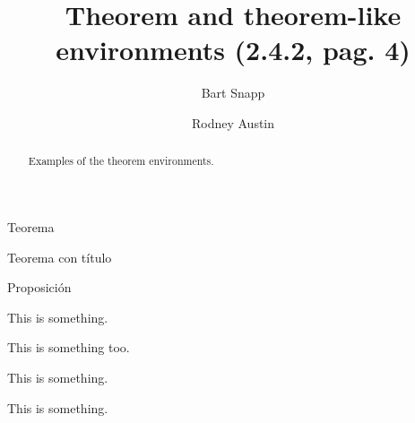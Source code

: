 \documentclass{ximera}
\author{Bart Snapp \and Rodney Austin}
\title[Examples:]{Theorem and theorem-like environments (2.4.2, pag. 4)}
\begin{document}
\begin{abstract}
  Examples of the theorem environments.
\end{abstract}
\maketitle


\lipsum[1]
%
\begin{thm} Teorema
\lipsum[1]
\end{thm}

\vspace*{1ex}

\lipsum[1]

\begin{thm}[título]
Teorema con título
\lipsum[1]
\end{thm}

\lipsum[1]

\begin{prp}[título]
Proposición
\lipsum[1]
\end{prp}

\lipsum[1]

\begin{theorem}
  This is something.\lipsum[1]
\end{theorem}

\lipsum[1]

\begin{theorem}[My theorem]
  This is something too.
\end{theorem}

\begin{algorithm}
  This is something.
\end{algorithm}

\begin{axiom}
  This is something.
\end{axiom}
\end{document}
